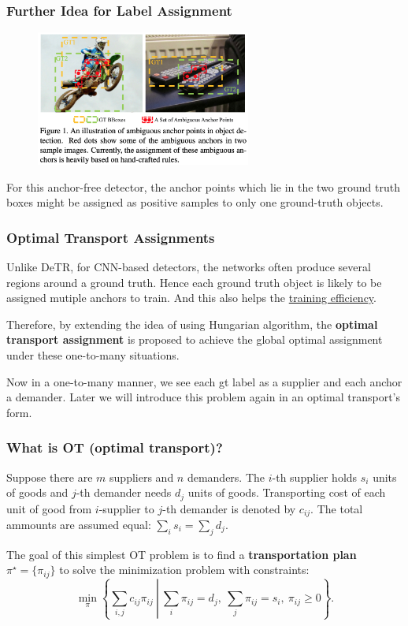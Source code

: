 \documentclass[slidetop, mathserif, dvipsnames]{beamer}
\begin{document}
\begin{frame}
    \frametitle{Further Idea for Label Assignment}

    \begin{figure}
    \includegraphics[width=200pt]{pics/ota_motivation.png}
    \end{figure}

    For this anchor-free detector, the anchor points which lie in the two
    ground truth boxes might be assigned as positive samples to
    only one ground-truth objects.

\end{frame}

\begin{frame}
    \frametitle{Optimal Transport Assignments}

    Unlike DeTR, for CNN-based detectors, the networks often produce several
    regions around a ground truth.
    Hence each ground truth object is likely to be assigned mutiple anchors
    to train. And this also helps the \underline{training efficiency}.

    \quad

    Therefore, by extending the idea of using Hungarian algorithm,
    the {\bf optimal transport assignment} is proposed
    to achieve the global optimal assignment under these one-to-many situations.

    \quad 

    Now in a one-to-many manner, we see each gt label as a supplier and each
    anchor a demander.
    Later we will introduce this problem again in an optimal transport's form.

\end{frame}

\begin{frame}
    \frametitle{What is OT (optimal transport)?}

    Suppose there are $m$ suppliers and $n$ demanders. The $i$-th supplier
    holds $s_i$ units of goods and $j$-th demander needs $d_j$ units of goods.
    Transporting cost of each unit of good from $i$-supplier to $j$-th demander
    is denoted by $c_{ij}$.
    The total ammounts are assumed equal: $\sum_{i}s_i = \sum_j d_j$.

    \quad
    
    The goal of this simplest OT problem is to find a {\bf transportation plan}
    $\pi^\star = \{\pi_{ij}\}$ to solve the minimization problem with constraints:
    \[
        \min_\pi\left\{\sum_{i,j} c_{ij}\pi_{ij}\ \left|\ \sum_i \pi_{ij} = d_j,~ \sum_j \pi_{ij}=s_i,~ \pi_{ij}\geq 0\right.\right\}.
    \]
    
\end{frame}
\end{document}
